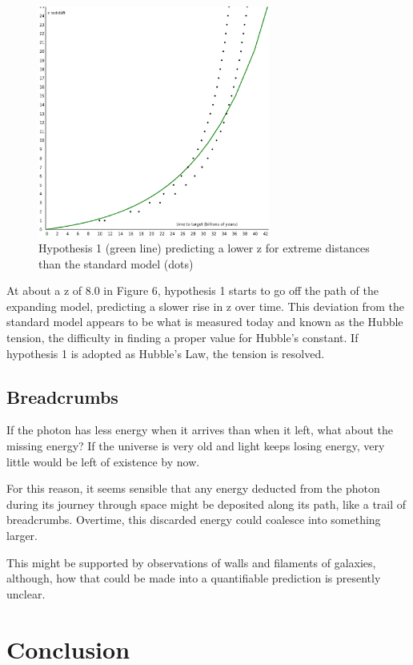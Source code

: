 \documentclass{ws-mpla}
\begin{document}
\begin{figure}[hb]
\centerline{\includegraphics[width=3.0in]{graph_white_test2_3.eps}}
\vspace*{8pt}
\caption{Hypothesis 1 (green line) predicting a lower z for extreme distances than the standard model (dots)\protect\label{fig8}}
\end{figure}

At about a z of 8.0 in Figure 6, hypothesis 1 starts to go off the path of the expanding model, predicting a slower rise in z over time.
This deviation from the standard model appears to be what is measured today and known as the Hubble tension, the difficulty in finding a proper value for Hubble's constant. If hypothesis 1 is adopted as Hubble's Law, the tension is resolved. 

\subsection{Breadcrumbs}

If the photon has less energy when it arrives than when it left, what about the missing energy? If the universe is very old and 
light keeps losing energy, very little would be left of existence by now. 

For this reason, it seems sensible that any energy deducted from the photon during its journey through space might be deposited along its path, like a trail of breadcrumbs. Overtime, this discarded energy could coalesce into something larger. 

This might be supported by observations of walls and filaments of galaxies, although, how that could be made into a quantifiable prediction is presently unclear.

\section{Conclusion}
\end{document}
